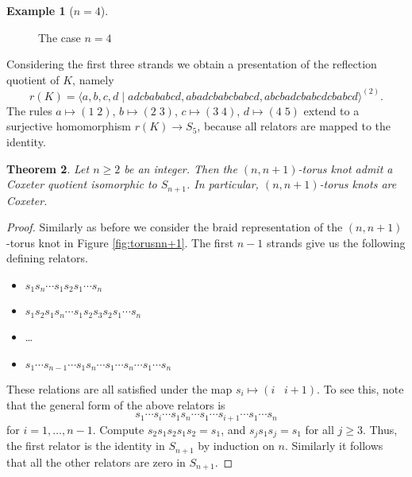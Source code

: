 \documentclass{article}
\newtheorem{theorem}{Theorem}[section]
\theoremstyle{definition}
\newtheorem{example}[theorem]{Example}
\begin{document}
\begin{example}[$n=4$]
\begin{figure}[ht]
\caption{The case $n = 4$}
\label{fig:torus45}
\end{figure}

Considering the first three strands we obtain a presentation of the reflection quotient of $K$, namely
$$r(K) = \langle a, b, c, d \; | \; adcbababcd, abadcbabcbabcd, abcbadcbabcdcbabcd \rangle^{(2)}.$$
The rules $a \mapsto (1 \; 2)$, $b \mapsto (2 \; 3)$, $c \mapsto (3 \; 4)$, $d \mapsto (4 \; 5)$ extend to a surjective homomorphism $r(K) \rightarrow S_5$, because all relators are mapped to the identity.
\end{example}

\begin{theorem}
Let $n \geq 2$ be an integer. Then the $(n, n+1)$-torus knot admit a Coxeter quotient isomorphic to $S_{n+1}$. In particular, $(n, n+1)$-torus knots are Coxeter.
\end{theorem}

\begin{proof} Similarly as before we consider the braid representation of the $(n, n+1)$-torus knot in Figure \ref{fig:torusnn+1}. The first $n-1$ strands give us the following defining relators.
\begin{itemize}
\item $s_1 s_n \cdots s_1 s_2 s_1 \cdots s_n$
\item $s_1s_2s_1 s_n \cdots s_1 s_2 s_3 s_2 s_1 \cdots s_n$
\item \dots
\item $s_1 \cdots s_{n-1} \cdots s_1 s_n \cdots s_1 \cdots s_n \cdots s_1 \cdots s_n$
\end{itemize}
These relations are all satisfied under the map $s_i \mapsto (i \;\;\; i+1)$. To see this, note that the general form of the above relators is
$$
s_1 \cdots s_i \cdots s_1 s_n \cdots s_1 \cdots s_{i + 1} \cdots s_1 \cdots s_n
$$
for $i = 1, \dots, n-1$. Compute $s_2s_1s_2s_1s_2 = s_1$,
and $s_js_1s_j = s_1$ for all $j \geq 3$. Thus, the first relator is the identity in $S_{n+1}$ by induction on $n$. Similarly it follows that all the other relators are zero in $S_{n+1}$.
\end{proof}
\end{document}
